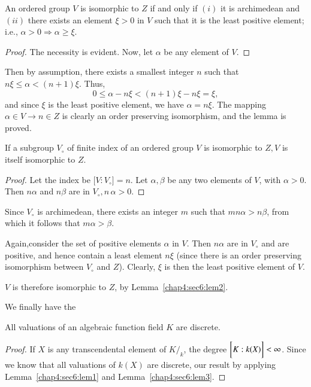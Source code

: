 \begin{Lemma}\label{chap4:sec6:lem2}%
  An ordered group $V$ is isomorphic to $Z$ if and only if $(i)$ it is
  archimedean and $(ii)$ there exists an element $\xi > 0$ in $V$ such
  that it is the least positive element; i.e., $\alpha > 0 \Rightarrow
  \alpha \geq \xi$. 
\end{Lemma}

\begin{proof}
  The necessity is evident. Now, let $\alpha$ be any element of $V$.
\end{proof}

Then by assumption, there exists a smallest integer $n$ such that $n
\xi \leq \alpha < (n+1) \xi$. Thus, 
$$
0 \leq \alpha -n \xi < (n+1) \xi -n \xi = \xi,
$$
and since $\xi$ is the least positive element, we have $\alpha
=n\xi$. The mapping $\alpha \in V \to n \in Z$ is clearly an order
preserving isomorphism, and the lemma is proved. 

\begin{Lemma}\label{chap4:sec6:lem3}%
  If a subgroup $V_\circ$ of finite index of an ordered group $V$ is
  isomorphic to $Z, V$ is itself isomorphic to $Z$. 
\end{Lemma}

\begin{proof}
  Let the index be $\bigg [ V : V_\circ \bigg] =n$. Let $\alpha, \beta$
  be any two elements of $V$, with $\alpha > 0$. Then $n \alpha$ and
  $n \beta$ are in $V_\circ, n \,\alpha > 0$. 
\end{proof}

Since $V_\circ$ is archimedean, there exists an integer $m$ such that
$m n \alpha > n \beta$, from which it follows that $m \alpha >
\beta$. 

Again,\pageoriginale consider the set of positive elements $\alpha$ in $V$. Then $n
\alpha$ are in $V_\circ$ and are positive, and hence contain a least
element $n \xi$ (since there is an order preserving isomorphism
between $V_\circ$ and $Z$). Clearly, $\xi$ is then the least positive
element of $V$. 

$V$ is therefore isomorphic to $Z$, by Lemma~\ref{chap4:sec6:lem2}.

We finally have the
\begin{theorem*}
  All valuations of an algebraic function field $K$ are discrete.
\end{theorem*}

\begin{proof}
  If $X$ is any transcendental element of $K/_k$, the degree $\bigg[ K
    : k(X)\bigg]\break < \infty$. Since we know that all valuations of
  $k(X)$ are discrete, our result by applying Lemma~\ref{chap4:sec6:lem1} and
  Lemma~\ref{chap4:sec6:lem3}. 
\end{proof}

